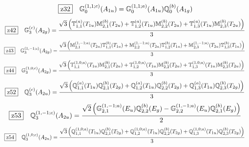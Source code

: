 \documentclass[fleqn,10pt,landscape]{jsarticle}
\begin{document}
\begin{dmath*}
\hspace*{3mm}\fbox{z32}\quad \mathbb{G}_{0}^{(1,1;c)}(A_{1u})=\mathbb{G}_{0}^{(1,1;a)}(A_{1u}) \mathbb{Q}_{0}^{(b)}(A_{1g})
\end{dmath*}
\begin{dmath*}
\hspace*{3mm}\fbox{z42}\quad \mathbb{G}_{3}^{(c)}(A_{2g})=\frac{\sqrt{3} \left(\mathbb{T}_{1,1}^{(a)}(T_{1u}) \mathbb{M}_{2,1}^{(b)}(T_{2u}) + \mathbb{T}_{1,2}^{(a)}(T_{1u}) \mathbb{M}_{2,2}^{(b)}(T_{2u}) + \mathbb{T}_{1,3}^{(a)}(T_{1u}) \mathbb{M}_{2,3}^{(b)}(T_{2u})\right)}{3}
\end{dmath*}
\begin{dmath*}
\hspace*{3mm}\fbox{z43}\quad \mathbb{G}_{3}^{(1,-1;c)}(A_{2g})=\frac{\sqrt{3} \left(\mathbb{M}_{2,1}^{(1,-1;a)}(T_{2u}) \mathbb{T}_{1,1}^{(b)}(T_{1u}) + \mathbb{M}_{2,2}^{(1,-1;a)}(T_{2u}) \mathbb{T}_{1,2}^{(b)}(T_{1u}) + \mathbb{M}_{2,3}^{(1,-1;a)}(T_{2u}) \mathbb{T}_{1,3}^{(b)}(T_{1u})\right)}{3}
\end{dmath*}
\begin{dmath*}
\hspace*{3mm}\fbox{z44}\quad \mathbb{G}_{3}^{(1,0;c)}(A_{2g})=\frac{\sqrt{3} \left(\mathbb{T}_{1,1}^{(1,0;a)}(T_{1u}) \mathbb{M}_{2,1}^{(b)}(T_{2u}) + \mathbb{T}_{1,2}^{(1,0;a)}(T_{1u}) \mathbb{M}_{2,2}^{(b)}(T_{2u}) + \mathbb{T}_{1,3}^{(1,0;a)}(T_{1u}) \mathbb{M}_{2,3}^{(b)}(T_{2u})\right)}{3}
\end{dmath*}
\begin{dmath*}
\hspace*{3mm}\fbox{z52}\quad \mathbb{Q}_{3}^{(c)}(A_{2u})=\frac{\sqrt{3} \left(\mathbb{Q}_{1,1}^{(a)}(T_{1u}) \mathbb{Q}_{2,1}^{(b)}(T_{2g}) + \mathbb{Q}_{1,2}^{(a)}(T_{1u}) \mathbb{Q}_{2,2}^{(b)}(T_{2g}) + \mathbb{Q}_{1,3}^{(a)}(T_{1u}) \mathbb{Q}_{2,3}^{(b)}(T_{2g})\right)}{3}
\end{dmath*}
\begin{dmath*}
\hspace*{3mm}\fbox{z53}\quad \mathbb{Q}_{3}^{(1,-1;c)}(A_{2u})=\frac{\sqrt{2} \left(\mathbb{G}_{2,1}^{(1,-1;a)}(E_{u}) \mathbb{Q}_{2,2}^{(b)}(E_{g}) - \mathbb{G}_{2,2}^{(1,-1;a)}(E_{u}) \mathbb{Q}_{2,1}^{(b)}(E_{g})\right)}{2}
\end{dmath*}
\begin{dmath*}
\hspace*{3mm}\fbox{z54}\quad \mathbb{Q}_{3}^{(1,0;c)}(A_{2u})=\frac{\sqrt{3} \left(\mathbb{Q}_{1,1}^{(1,0;a)}(T_{1u}) \mathbb{Q}_{2,1}^{(b)}(T_{2g}) + \mathbb{Q}_{1,2}^{(1,0;a)}(T_{1u}) \mathbb{Q}_{2,2}^{(b)}(T_{2g}) + \mathbb{Q}_{1,3}^{(1,0;a)}(T_{1u}) \mathbb{Q}_{2,3}^{(b)}(T_{2g})\right)}{3}
\end{dmath*}
\end{document}
